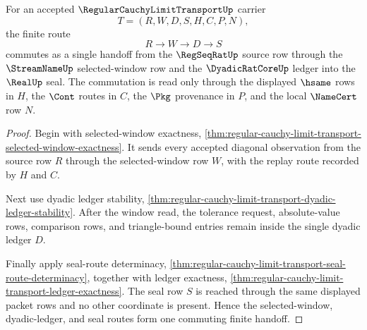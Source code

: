 \begin{theorem}
\label{thm:regular-cauchy-limit-transport-window-dyadic-seal-triangle}
For an accepted $\RegularCauchyLimitTransportUp$ carrier
$$
T=(R,W,D,S,H,C,P,N),
$$
the finite route
$$
R \to W \to D \to S
$$
commutes as a single handoff from the $\RegSeqRatUp$ source row through the $\StreamNameUp$ selected-window row and the $\DyadicRatCoreUp$ ledger into the $\RealUp$ seal. The commutation is read only through the displayed $\hsame$ rows in $H$, the $\Cont$ routes in $C$, the $\Pkg$ provenance in $P$, and the local $\NameCert$ row $N$.
\end{theorem}
\begin{proof}
Begin with selected-window exactness, \autoref{thm:regular-cauchy-limit-transport-selected-window-exactness}. It sends every accepted diagonal observation from the source row $R$ through the selected-window row $W$, with the replay route recorded by $H$ and $C$.

Next use dyadic ledger stability, \autoref{thm:regular-cauchy-limit-transport-dyadic-ledger-stability}. After the window read, the tolerance request, absolute-value rows, comparison rows, and triangle-bound entries remain inside the single dyadic ledger $D$.

Finally apply seal-route determinacy, \autoref{thm:regular-cauchy-limit-transport-seal-route-determinacy}, together with ledger exactness, \autoref{thm:regular-cauchy-limit-transport-ledger-exactness}. The seal row $S$ is reached through the same displayed packet rows and no other coordinate is present. Hence the selected-window, dyadic-ledger, and seal routes form one commuting finite handoff.
\end{proof}

